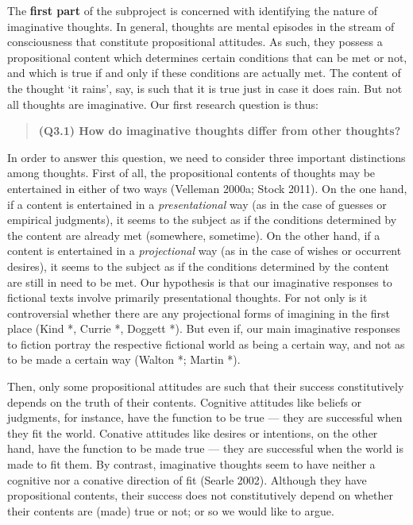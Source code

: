 The \textbf{first part} of the subproject is concerned with identifying the nature of imaginative thoughts. In general, thoughts are mental episodes in the stream of consciousness that constitute propositional attitudes. As such, they possess a propositional content which determines certain conditions that can be met or not, and which is true if and only if these conditions are actually met. The content of the thought `it rains', say, is such that it is true just in case it does rain. But not all thoughts are imaginative. Our first research question is thus:

\vspace{-.2cm}
\begin{quote}
\textbf{(Q3.1) How do imaginative thoughts differ from other thoughts?}
\end{quote}
\vspace{-.2cm}

\noindent In order to answer this question, we need to consider three important distinctions among thoughts. First of all, the propositional contents of thoughts may be entertained in either of two ways (Velleman 2000a; Stock 2011). On the one hand, if a content is entertained in a \emph{presentational} way (as in the case of guesses or empirical judgments), it seems to the subject as if the conditions determined by the content are already met (somewhere, sometime). On the other hand, if a content is entertained in a \emph{projectional} way (as in the case of wishes or occurrent desires), it seems to the subject as if the conditions determined by the content are still in need to be met. Our hypothesis is that our imaginative responses to fictional texts involve primarily presentational thoughts. For not only is it controversial whether there are any projectional forms of imagining in the first place (Kind *, Currie *, Doggett *). But even if, our main imaginative responses to fiction portray the respective fictional world as being a certain way, and not as to be made a certain way (Walton *; Martin *).

Then, only some propositional attitudes are such that their success constitutively depends on the truth of their contents. Cognitive attitudes like beliefs or judgments, for instance, have the function to be true --- they are successful when they fit the world. Conative attitudes like desires or intentions, on the other hand, have the function to be made true --- they are successful when the world is made to fit them. By contrast, imaginative thoughts seem to have neither a cognitive nor a conative direction of fit (Searle 2002). Although they have propositional contents, their success does not constitutively depend on whether their contents are (made) true or not; or so we would like to argue.

